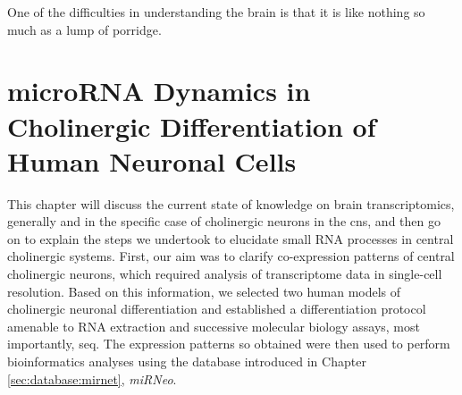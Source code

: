 
\begin{savequote}[70mm]
One of the difficulties in understanding the brain is that it is like nothing so much as a lump of porridge.
\end{savequote}

\chapter[microRNA Dynamics in Cholinergic Differentiation\texorpdfstring{\\}{} of Human Neuronal Cells]{microRNA Dynamics in Cholinergic Differentiation of Human Neuronal Cells}
This chapter will discuss the current state of knowledge on brain transcriptomics, generally and in the specific case of cholinergic neurons in the \ac{cns}, and then go on to explain the steps we undertook to elucidate small RNA processes in central cholinergic systems. First, our aim was to clarify co-expression patterns of central cholinergic neurons, which required analysis of transcriptome data in single-cell resolution. Based on this information, we selected two human models of cholinergic neuronal differentiation and established a differentiation protocol amenable to RNA extraction and successive molecular biology assays, most importantly, \ac{seq}. The expression patterns so obtained were then used to perform bioinformatics analyses using the database introduced in Chapter \ref{sec:database:mirnet}, \textit{miRNeo}. 









